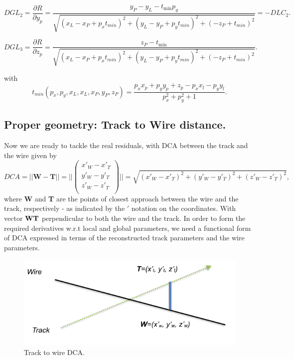 \documentclass[a4paper,11pt]{article}
\begin{document}
\begin{equation}	
DGL_2 = \frac{\partial R}{\partial y_p} = \frac{ y_P-y_L-t_{\min } p_y}{\sqrt{(x_L - x_P + p_xt_{min})^2 + (y_L - y_P + p_yt_{min})^2  + (-z_P + t_{min})^2 }} = - DLC_2.
\end{equation}

\begin{equation}	
DGL_3 = \frac{\partial R}{\partial z_p} = \frac{ z_P-t_{\min }}{\sqrt{(x_L - x_P + p_xt_{min})^2 + (y_L - y_P + p_yt_{min})^2  + (-z_P + t_{min})^2 }}.
\end{equation}

with 
\begin{equation}
 t_{min}(p_x, p_y, x_L, x_L, x_P, y_P, z_P) = \frac{p_x x_p + p_yy_p +z_p-p_xx_l-p_yy_l}{p^2_x+p^2_y+1}.
\end{equation}


\subsection{Proper geometry: Track to Wire distance.}

Now we are ready to tackle the real residuals, with DCA between the track and the wire given by
\begin{equation}
DCA = || \textbf{W} - \textbf{T} || = || \begin{pmatrix}x'_W - x'_T\\y'_W - y'_T\\z'_W - z'_T\\\end{pmatrix} || = \sqrt{ (x'_W - x'_T)^2 + (y'_W - y'_T)^2 + (z'_W - z'_T)^2},
\end{equation}
where \textbf{W} and \textbf{T} are the points of closest approach between the wire and the track, respectively - as indicated by the $'$ notation on the coordinates. With vector $\bf{WT}$ perpendicular to both the wire and the track. In order to form the required derivatives w.r.t local and global parameters, we need a functional form of DCA expressed in terms of the reconstructed track parameters and the wire parameters.
\begin{figure}[!ht]
\centering
\includegraphics[width=0.6\linewidth]{fig/WireLine.png}
\caption{Track to wire DCA.}
\label{fig:WireLine}
\end{figure}
\end{document}
